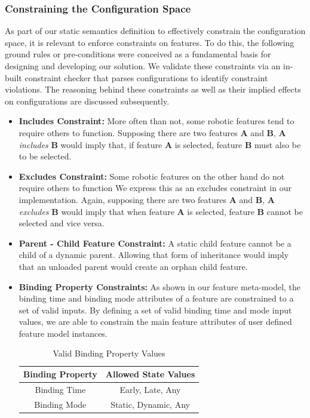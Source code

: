 \documentclass[conference]{IEEEtran}
\begin{document}
\subsubsection{Constraining the Configuration Space}
As part of our static semantics definition to effectively constrain the configuration space, it is relevant to enforce constraints on features. To do this, the following ground rules or pre-conditions were conceived as a fundamental basis for designing and developing our solution. We validate these constraints via an in-built constraint checker that parses configurations to identify constraint violations. The reasoning behind these constraints as well as their implied effects on configurations are discussed subsequently.
\begin{itemize}
    \item \textbf{Includes Constraint: }
    More often than not, some robotic features tend to require others to function. Supposing there are two features \textbf{A} and \textbf{B}, \textbf{A} \textit{includes} \textbf{B} would imply that, if feature \textbf{A} is selected, feature \textbf{B} must also be to be selected.
    
    \item \textbf{Excludes Constraint: }
    Some robotic features on the other hand do not require others to function We express this as an excludes constraint in our implementation. Again, supposing there are two features \textbf{A} and \textbf{B}, \textbf{A} \textit{excludes} \textbf{B} would imply that when feature \textbf{A} is selected, feature \textbf{B} cannot be selected and vice versa.
    
    
    \item \textbf{Parent - Child Feature Constraint: }
    A static child feature cannot be a child of a dynamic parent. Allowing that form of inheritance would imply that an unloaded parent would create an orphan child feature. 
    

\item \textbf{Binding Property Constraints: }
As shown in our feature meta-model, the binding time and binding mode attributes of a feature are constrained to a set of valid inputs. By defining a set of valid binding time and mode input values, we are able to constrain the main feature attributes of user defined feature model instances.

\begin{table}[htbp]
\caption{Valid Binding Property Values}
\begin{center}
\begin{tabular}{|c|c|}
\hline
    Binding Property & Allowed State Values  \\ \hline
    Binding Time & Early, Late, Any \\ \hline
    Binding Mode & Static, Dynamic, Any\\ \hline
\end{tabular}
\label{tab:bpropcon}
\end{center}
\end{table}


\end{itemize}
\end{document}
